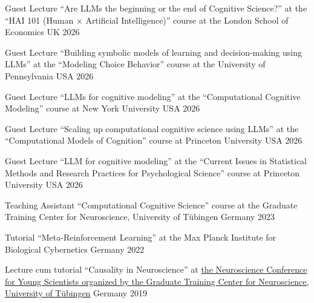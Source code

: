 
\begin{cvhonors}


  \cvhonor
    {Guest Lecture} %
    {``Are LLMs the beginning or the end of Cognitive Science?'' at the  ``HAI 101 (Human × Artificial Intelligence)''  course at the London School of Economics} %
    {UK} %
    {2026} %
    
  \cvhonor
    {Guest Lecture} %
    {``Building symbolic models of learning and decision-making using LLMs'' at the  ``Modeling Choice Behavior''  course at the University of Pennsylvania} %
    {USA} %
    {2026} %
    
  \cvhonor
    {Guest Lecture} %
    {``LLMs for cognitive modeling'' at the ``Computational Cognitive Modeling''  course at New York University} %
    {USA} %
    {2026} %
    
  \cvhonor
    {Guest Lecture} %
    {``Scaling up computational cognitive science using LLMs'' at the ``Computational Models of Cognition''  course at Princeton University} %
    {USA} %
    {2026} %
    
  \cvhonor
    {Guest Lecture} %
    {``LLM for cognitive modeling'' at the ``Current Issues in Statistical Methods and Research Practices for Psychological Science'' course at Princeton University} %
    {USA} %
    {2026} %
    
  \cvhonor
    {Teaching Assistant} %
    {``Computational Cognitive Science'' course at the Graduate Training Center for Neuroscience, University of Tübingen} %
    {Germany} %
    {2023} %

  \cvhonor
    {Tutorial} %
    {``Meta-Reinforcement Learning'' at the Max Planck Institute for Biological Cybernetics} %
    {Germany} %
    {2022} %

 \cvhonor
    {Lecture cum tutorial} %
    {``Causality in Neuroscience'' at \href{https://nenaconference.wordpress.com/wp-content/uploads/2019/10/schedule_nena2019.pdf}{the Neuroscience Conference for Young Scientists organized by the Graduate Training Center for Neuroscience, University of Tübingen}} %
    {Germany} %
    {2019} %
    \vspace{3mm}

    
\end{cvhonors}

